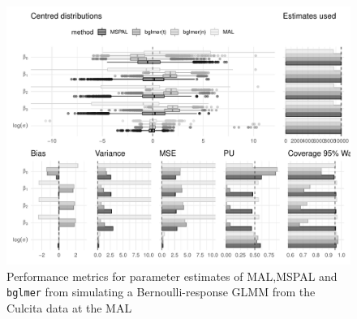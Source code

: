 \documentclass[11pt, a4paper]{article}
\theoremstyle{example} \newtheorem{example}{Example}[section]
\theoremstyle{theorem} \newtheorem{theorem}{Theorem}[section]
\begin{document}
\begin{figure}[t]
  \begin{center}
    \includegraphics[width = \textwidth]{Figures/simulation_results.pdf}
  \end{center}
  \caption{Performance metrics for parameter estimates of MAL,MSPAL and \texttt{bglmer} from simulating a Bernoulli-response GLMM from the Culcita data at the MAL}
  \label{fig:culcita_simu0}
\end{figure}
\end{document}
